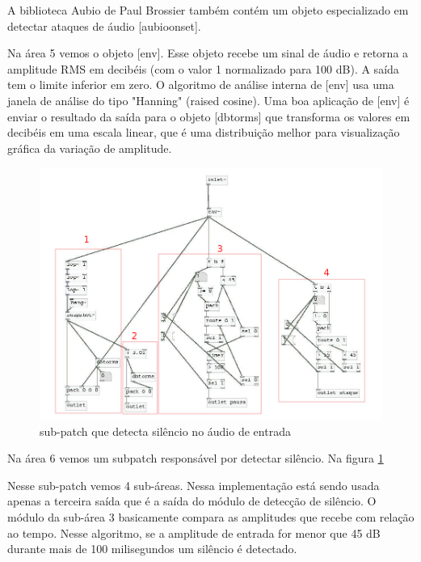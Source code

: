 \documentclass{ppgmus}
\begin{document}
A biblioteca Aubio de Paul Brossier também contém um objeto
especializado em detectar ataques de áudio [aubioonset\texttildelow].



Na área 5 vemos o objeto [env\texttildelow]. Esse objeto recebe um sinal de áudio
e retorna a amplitude RMS em decibéis (com o valor 1 normalizado para 100 dB).
A saída tem o limite inferior em zero. O algoritmo de análise interna de [env\texttildelow]
usa uma janela de análise do tipo "Hanning" (raised cosine). Uma boa aplicação de 
[env\texttildelow] é enviar o resultado da saída para o objeto [dbtorms] que transforma
os valores em decibéis em uma escala linear, que é uma distribuição melhor para visualização
gráfica da variação de amplitude.






\begin{figure}
\includegraphics[scale=.5]{sinc-audioanalise-detecta}
\caption{sub-patch que detecta silêncio no áudio de entrada}
\label{[sinc-audioanalise-detecta]}
\end{figure}




Na área 6 vemos um subpatch responsável por detectar
silêncio. Na figura \ref{[sinc-audioanalise-detecta]}


Nesse sub-patch vemos 4 sub-áreas. Nessa implementação
está sendo usada apenas a terceira saída que é a saída do
módulo de detecção de silêncio. O módulo da sub-área 3
basicamente compara as amplitudes que recebe com relação ao tempo.
Nesse algoritmo, se a amplitude de entrada for menor que 45 dB durante
mais de 100 milisegundos um silêncio é detectado.
\end{document}
